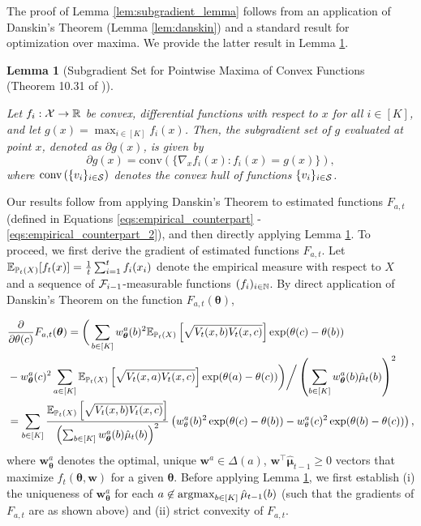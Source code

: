 \documentclass{article}
\newtheorem{lemma}{Lemma}
\begin{document}
\begin{appendices}
The proof of Lemma \ref{lem:subgradient_lemma} follows from an application of Danskin's Theorem (Lemma \ref{lem:danskin}) and a standard result for optimization over maxima. We provide the latter result in Lemma \ref{lem:clarke_subgradient}.

\begin{lemma}[Subgradient Set for Pointwise Maxima of Convex Functions (Theorem 10.31 of \citealp{rockafellar2009variational})]\label{lem:clarke_subgradient}

    Let $f_i: \mathcal{X} \rightarrow \mathbb{R}$ be convex, differential functions with respect to $x$ for all $i \in [K]$, and let $g(x) = \max_{i \in [K]} f_i(x)$. Then, the subgradient set of $g$ evaluated at point $x$, denoted as $\partial g(x)$, is given by
    \begin{equation}
        \partial g(x) = \text{conv}\left( \{\nabla_x f_i(x): f_i(x) = g(x) \} \right),
    \end{equation}
    where $\text{conv}\left(\{v_i\}_{i \in \mathcal{S}} \right)$ denotes the convex hull of functions $\{v_i\}_{i \in \mathcal{S}}$. 
\end{lemma}

Our results follow from applying Danskin's Theorem to estimated functions $F_{a,t}$ (defined in Equations \ref{eqs:empirical_counterpart} - \ref{eqs:empirical_counterpart_2}), and then directly applying Lemma \ref{lem:clarke_subgradient}. To proceed, we first derive the gradient of estimated functions $F_{a,t}$. Let $\mathbb{E}_{\mathbb{P}_t(X)}[f_t(x)] = \frac{1}{t}\sum_{i=1}^t f_i(x_i)$ denote the empirical measure with respect to $X$ and a sequence of $\mathcal{F}_{i-1}$-measurable functions $(f_i)_{i \in \mathbb{N}}$. By direct application of Danskin's Theorem on the function $F_{a,t}(\bm{\theta})$,

\begin{align}
    &\frac{\partial}{\partial \theta(c)} F_{a,t}(\boldsymbol\theta) =  \bigg(\sum_{b \in [K]} w_{\boldsymbol\theta}^a(b)^2 \mathbb{E}_{\mathbb{P}_t(X)}\left[\sqrt{V_t(x,b)V_t(x,c)} \right]\exp (\theta(c) - \theta(b)) \\
    & - w_{\boldsymbol\theta}^a(c)^2\sum_{a \in [K] }\mathbb{E}_{\mathbb{P}_t(X)}\left[ \sqrt{V_t(x,a)V_t(x,c)}  \right]\exp(\theta(a) - \theta(c))\bigg) \bigg/ \left(\sum_{b \in [K]} w_{\boldsymbol{\theta}}^a(b) \hat\mu_t(b)\right)^2 \\
    & = \sum_{b \in [K]}\frac{\mathbb{E}_{\mathbb{P}_t(X)}\left[\sqrt{V_t(x,b)V_t(x,c)} \right]}{\left(\sum_{b \in [K]} w_{\boldsymbol{\theta}}^a(b) \hat\mu_t(b)\right)^2} \left(  w_\theta^a(b)^2\exp(\theta(c) - \theta(b)) - w_\theta^a(c)^2 \exp(\theta(b)-\theta(c))\right), \label{eq:first_order_partial}
\end{align}
where $\bm{w}_{\bm\theta}^a$ denotes the optimal, unique $\bm{w}^a \in \Delta(a)$, $\bm{w}^\top \hat{\bm{\mu}}_{t-1} \geq 0$ vectors that maximize $f_t(\bm{\theta}, \bm{w})$ for a given $\bm\theta$. Before applying Lemma \ref{lem:clarke_subgradient}, we first establish (i) the uniqueness of $\bm{w}_{\bm\theta}^a$ for each $a \not\in \argmax_{b \in [K]} \hat\mu_{t-1}(b)$ (such that the gradients of $F_{a,t}$ are as shown above) and (ii) strict convexity of $F_{a,t}$. 


\end{appendices}
\end{document}
